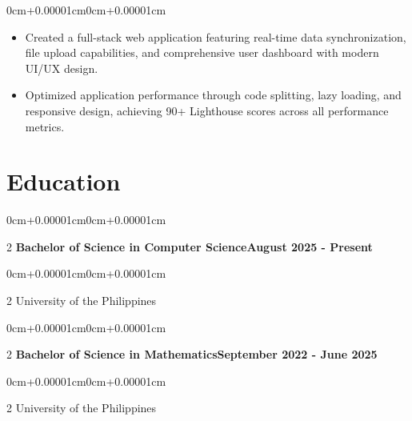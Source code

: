 \documentclass[11pt, letterpaper]{article}
\newenvironment{highlights}{\begin{itemize}[topsep=0.08cm,parsep=0.08cm,partopsep=0pt,itemsep=0pt,leftmargin=0cm+10pt]}{\end{itemize}}
\newenvironment{onecolentry}{\begin{adjustwidth}{0cm+0.00001cm}{0cm+0.00001cm}}{\end{adjustwidth}}
\newenvironment{twocolentry}[2][]{\onecolentry\def\secondColumn{#2}\setcolumnwidth{\fill,5.2cm}\begin{paracol}{2}}{\switchcolumn \raggedleft \secondColumn\end{paracol}\endonecolentry}
\begin{document}
    \vspace{0.10cm}
    \begin{onecolentry}
        \begin{highlights}
            \item Created a full-stack web application featuring real-time data synchronization, file upload capabilities, and comprehensive user dashboard with modern UI/UX design.
            \item Optimized application performance through code splitting, lazy loading, and responsive design, achieving 90+ Lighthouse scores across all performance metrics.
        \end{highlights}
    \end{onecolentry}
    \vspace{0.15cm}

\section{Education}

    \begin{twocolentry}{\textbf{August 2025 - Present}}
    \textbf{Bachelor of Science in Computer Science}\end{twocolentry}
    \vspace{0.05cm}
    \begin{twocolentry}{}
    University of the Philippines\end{twocolentry}
    \vspace{0.15cm}

    \begin{twocolentry}{\textbf{September 2022 - June 2025}}
    \textbf{Bachelor of Science in Mathematics}\end{twocolentry}
    \vspace{0.05cm}
    \begin{twocolentry}{}
    University of the Philippines\end{twocolentry}
    \vspace{0.15cm}
\end{document}
